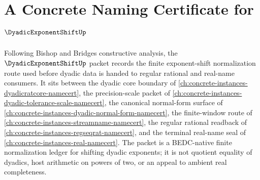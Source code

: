 \chapter{A Concrete Naming Certificate for $\DyadicExponentShiftUp$}
\label{ch:concrete-instances-dyadic-exponent-shift-namecert}

Following Bishop and Bridges constructive analysis, the $\DyadicExponentShiftUp$ packet records the finite exponent-shift normalization route used before dyadic data is handed to regular rational and real-name consumers. It sits between the dyadic core boundary of \autoref{ch:concrete-instances-dyadicratcore-namecert}, the precision-scale packet of \autoref{ch:concrete-instances-dyadic-tolerance-scale-namecert}, the canonical normal-form surface of \autoref{ch:concrete-instances-dyadic-normal-form-namecert}, the finite-window route of \autoref{ch:concrete-instances-streamname-namecert}, the regular rational readback of \autoref{ch:concrete-instances-regseqrat-namecert}, and the terminal real-name seal of \autoref{ch:concrete-instances-real-namecert}. The packet is a BEDC-native finite normalization ledger for shifting dyadic exponents; it is not quotient equality of dyadics, host arithmetic on powers of two, or an appeal to ambient real completeness.

